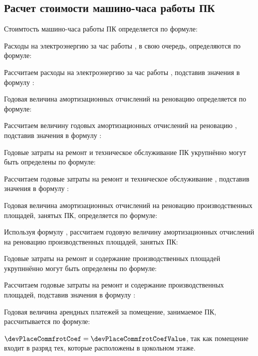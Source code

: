 \subsection{Расчет стоимости машино-часа работы ПК}
\label{sec:economics:cpuclocktime}

Стоимтость машино-часа работы ПК определяется по формуле:
\pcHourCostEquation

Расходы на электроэнергию за час работы \pc, в свою очередь, определяются по формуле:
\energyHourCostEquation

Рассчитаем расходы на электроэнергию за час работы \pc, подставив значения в формулу :
\energyHourCostFormulaApplied

Годовая величина амортизационных отчислений на реновацию \pc определяется по формуле:
\pcAmortizationCostEquation

Рассчитаем величину годовых амортизационных отчислений на реновацию \pc, подставив значения в формулу :
\pcAmortizationCostFormulaApplied

Годовые затраты на ремонт и техническое обслуживание ПК укрупнённо могут быть определены по формуле:
\pcSupportCostEquation

Рассчитаем годовые затраты на ремонт и техническое обслуживание \pc, подставив значения в формулу :
\pcSupportCostFormulaApplied

Годовая величина амортизационных отчислений на реновацию производственных площадей, занятых ПК, определяется по формуле:
\devPlaceAmortizationCostEquation

Используя формулу , рассчитаем годовую величину амортизационных отчислений на реновацию производственных площадей, занятых ПК:
\devPlaceAmortizationCostFormulaApplied

Годовые затраты на ремонт и содержание производственных площадей укрупннённо могут быть определены по формуле:
\devPlaceSupportCostEquation

Рассчитаем годовые затраты на ремонт и содержание производственных площадей, подставив значения в формулу :
\devPlaceSupportCostFormulaApplied

Годовая величина арендных платежей за помещение, занимаемое ПК, рассчитывается по формуле:
\devPlaceRentCostEquation

\(\devPlaceCommfrotCoef = \devPlaceCommfrotCoefValue\), так как помещение входит в разряд тех, которые расположены в цокольном этаже.

